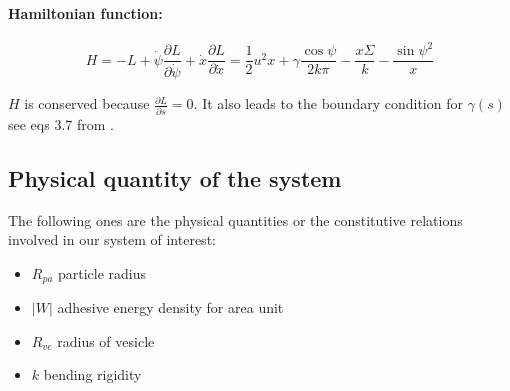\documentclass[12pt]{article}
\begin{document}
\paragraph*{Hamiltonian function:}

\begin{equation*}
  H = -L + \dot{\psi} \frac{\partial L}{\partial \dot{\psi}} + \dot{x} \frac{\partial L}{\partial \dot{x}}
  = \frac{1}{2} u^2 x +  \gamma \frac{\cos \psi}{2 k \pi} - \frac{x \Sigma}{k} - \frac{\sin \psi ^ 2}{x}
\end{equation*}









$H$ is conserved because $\frac{\partial L}{\partial s} = 0$. It also leads to the boundary condition for $\gamma(s)$ see eqs 3.7 from \cite{seifertShapeTransformationsVesicles1991}.




\subsection{Physical quantity of the system}
The following ones are the physical quantities or the constitutive relations involved in our system of interest:

\begin{itemize}
  \item $R_{pa}$ particle radius
  \item $|W|$ adhesive energy density for area unit
  \item $R_{ve}$ radius of vesicle
  \item $k$ bending rigidity
\end{itemize}
\end{document}
